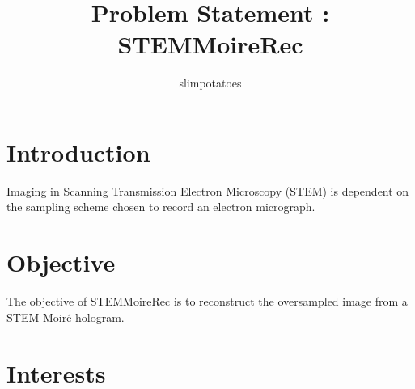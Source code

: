 \documentclass[
11pt,
a4paper,
oneside,
onecolumn,
final %
]{article}
\begin{document}
\title{\huge Problem Statement : \\ STEMMoireRec}
\author{slimpotatoes}
\maketitle

\clearpage

\tableofcontents
\clearpage

\section{Introduction}

Imaging in Scanning Transmission Electron Microscopy (STEM) is dependent on the sampling scheme chosen to record an electron micrograph.


\section{Objective}

The objective of STEMMoireRec is to reconstruct the oversampled image from a STEM Moir{\'e} hologram. 

\section{Interests}




%
%
\end{document}
